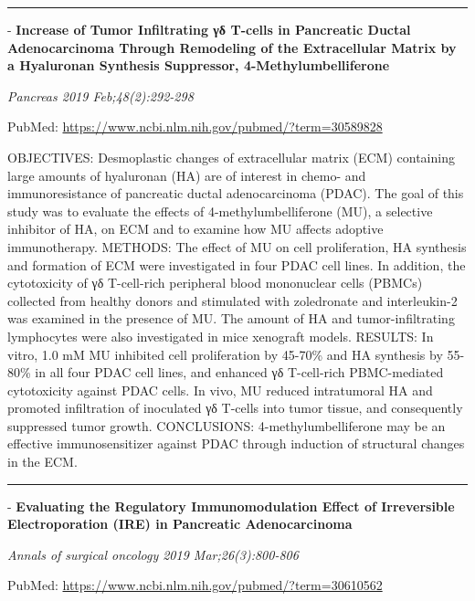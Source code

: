 \documentclass[]{article}
\begin{document}
{}

{}

\begin{center}\rule{0.5\linewidth}{\linethickness}\end{center}

 - \textbf{Increase of Tumor Infiltrating γδ T-cells in Pancreatic
Ductal Adenocarcinoma Through Remodeling of the Extracellular Matrix by
a Hyaluronan Synthesis Suppressor, 4-Methylumbelliferone}

\emph{Pancreas 2019 Feb;48(2):292-298}

PubMed: \url{https://www.ncbi.nlm.nih.gov/pubmed/?term=30589828}

OBJECTIVES: Desmoplastic changes of extracellular matrix (ECM)
containing large amounts of hyaluronan (HA) are of interest in chemo-
and immunoresistance of pancreatic ductal adenocarcinoma (PDAC). The
goal of this study was to evaluate the effects of 4-methylumbelliferone
(MU), a selective inhibitor of HA, on ECM and to examine how MU affects
adoptive immunotherapy. METHODS: The effect of MU on cell proliferation,
HA synthesis and formation of ECM were investigated in four PDAC cell
lines. In addition, the cytotoxicity of γδ T-cell-rich peripheral blood
mononuclear cells (PBMCs) collected from healthy donors and stimulated
with zoledronate and interleukin-2 was examined in the presence of MU.
The amount of HA and tumor-infiltrating lymphocytes were also
investigated in mice xenograft models. RESULTS: In vitro, 1.0 mM MU
inhibited cell proliferation by 45-70\% and HA synthesis by 55-80\% in
all four PDAC cell lines, and enhanced γδ T-cell-rich PBMC-mediated
cytotoxicity against PDAC cells. In vivo, MU reduced intratumoral HA and
promoted infiltration of inoculated γδ T-cells into tumor tissue, and
consequently suppressed tumor growth. CONCLUSIONS: 4-methylumbelliferone
may be an effective immunosensitizer against PDAC through induction of
structural changes in the ECM.

{}

{}

\begin{center}\rule{0.5\linewidth}{\linethickness}\end{center}

 - \textbf{Evaluating the Regulatory Immunomodulation Effect of
Irreversible Electroporation (IRE) in Pancreatic Adenocarcinoma}

\emph{Annals of surgical oncology 2019 Mar;26(3):800-806}

PubMed: \url{https://www.ncbi.nlm.nih.gov/pubmed/?term=30610562}
\end{document}
